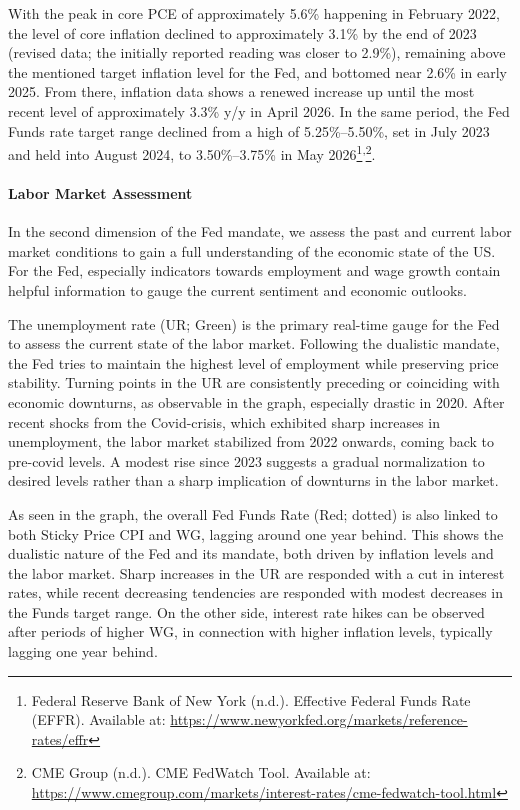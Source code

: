 \documentclass[11pt,a4paper]{article}
\begin{document}
With the peak in core PCE of approximately 5.6\% happening in February 2022, the level of core inflation declined to approximately 3.1\% by the end of 2023 (revised data; the initially reported reading was closer to 2.9\%), remaining above the mentioned target inflation level for the Fed, and bottomed near 2.6\% in early 2025. From there, inflation data shows a renewed increase up until the most recent level of approximately 3.3\% y/y in April 2026. In the same period, the Fed Funds rate target range declined from a high of 5.25\%--5.50\%, set in July 2023 and held into August 2024, to 3.50\%--3.75\% in May 2026\footnote{Federal Reserve Bank of New York (n.d.). Effective Federal Funds Rate (EFFR). Available at: \url{https://www.newyorkfed.org/markets/reference-rates/effr}}\textsuperscript{,}\footnote{CME Group (n.d.). CME FedWatch Tool. Available at: \url{https://www.cmegroup.com/markets/interest-rates/cme-fedwatch-tool.html}}.

\paragraph{Labor Market Assessment}

In the second dimension of the Fed mandate, we assess the past and current labor market conditions to gain a full understanding of the economic state of the US. For the Fed, especially indicators towards employment and wage growth contain helpful information to gauge the current sentiment and economic outlooks.


The unemployment rate (UR; Green) is the primary real-time gauge for the Fed to assess the current state of the labor market. Following the dualistic mandate, the Fed tries to maintain the highest level of employment while preserving price stability. Turning points in the UR are consistently preceding or coinciding with economic downturns, as observable in the graph, especially drastic in 2020. After recent shocks from the Covid-crisis, which exhibited sharp increases in unemployment, the labor market stabilized from 2022 onwards, coming back to pre-covid levels. A modest rise since 2023 suggests a gradual normalization to desired levels rather than a sharp implication of downturns in the labor market.

As seen in the graph, the overall Fed Funds Rate (Red; dotted) is also linked to both Sticky Price CPI and WG, lagging around one year behind. This shows the dualistic nature of the Fed and its mandate, both driven by inflation levels and the labor market. Sharp increases in the UR are responded with a cut in interest rates, while recent decreasing tendencies are responded with modest decreases in the Funds target range. On the other side, interest rate hikes can be observed after periods of higher WG, in connection with higher inflation levels, typically lagging one year behind.
\end{document}
